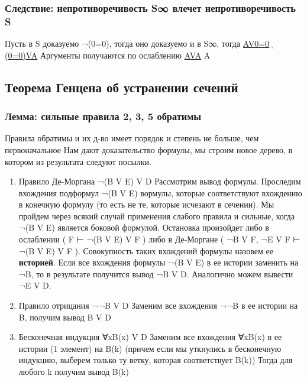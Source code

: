 \documentclass[11pt]{article}
\begin{document}
\subsubsection{Следствие: непротиворечивость S∞ влечет непротиворечивость S}
\label{sec-18-3-4}
Пусть в S доказуемо ¬(0=0), тогда оно доказуемо и в
S∞, тогда
\uline{AV0=0$_{\text{¬}}$(0=0)VA}          Аргументы получаются по ослаблению
\uline{AVA}
A
\subsection{Теорема Генцена об устранении сечений}
\label{sec-18-4}
\subsubsection{Лемма: сильные правила 2, 3, 5 обратимы}
\label{sec-18-4-1}
Правила обратимы и их д-во имеет порядок и степень не больше,
чем первоначальное
Нам дают доказательство формулы, мы строим новое дерево,
в котором из результата следуют посылки.
\begin{enumerate}
\item Правило Де-Моргана
¬(B V E) V D
Рассмотрим вывод формулы. Проследим вхождения
подформул ¬(B V E)  вормулы, которые соответствуют
вхождению в конечную формулу (то есть не те, которые
исчезают в сечении). Мы пройдем через всякий случай
применения слабого правила и сильные, когда ¬(B V E)
является боковой формулой. Остановка произойдет
либо в ослаблении ( F ⊢ ¬(B V E) V F ) либо в Де-Моргане
( ¬B V F, ¬E V F ⊢ ¬(B V E) V F ). Совокупность таких
вхождений формулы назовем ее \textbf{историей}.
Если все вхождения формулы ¬(B V E) в ее истории заменить
на ¬B, то в результате получится вывод ¬B V D. Аналогично
можем вывести ¬E V D.
\item Правило отрицания
¬¬B V D
Заменим все вхождения ¬¬B в ее истории на B, получим
вывод B V D
\item Бесконечная индукция
∀xB(x) V D
Заменим все вхождения ∀xB(x) в ее истории (1 элемент) на
B(k) (причем если мы уткнулись в бесконечную индукцию,
выберем только ту ветку, которая соответствует B(k))
Тогда для любого k получим вывод B(k)
\end{enumerate}
\end{document}

